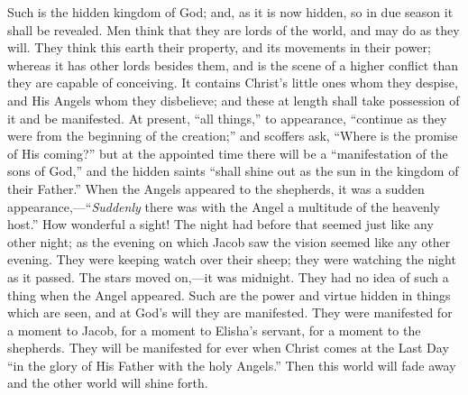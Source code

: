 Such is the hidden kingdom of God; and, as it is now hidden, so in
due season it shall be revealed. Men think that they are lords of the
world, and may do as they will. They think this earth their property,
and its movements in their power; whereas it has other lords besides
them, and is the scene of a higher conflict than they are capable of
conceiving. It contains Christ's little ones whom they despise, and
His Angels whom they disbelieve; and these at length shall take
possession of it and be manifested. At present, ``all
things,'' to appearance, ``continue as they were from the
beginning of the creation;'' and scoffers ask, ``Where is the
promise of His coming?'' but at the appointed time there will be a
``manifestation of the sons of God,'' and the hidden saints
``shall shine out as the sun in the kingdom of their Father.''
When the Angels appeared to the shepherds, it was a sudden appearance,—``\emph{Suddenly}
there was with the Angel a multitude of the heavenly host.'' How
wonderful a sight! The night had before that seemed just like any
other night; as the evening on which Jacob saw the vision seemed like
any other evening. They were keeping watch over their sheep; they were
watching the night as it passed. The stars moved on,—it was
midnight. They had no idea of such a thing when the Angel appeared.
Such are the power and virtue hidden in things which are seen, and at
God's will they are manifested. They were manifested for a moment to
Jacob, for a moment to Elisha's servant, for a moment to the
shepherds. They will be manifested for ever when Christ comes at the
Last Day ``in the glory of His Father with the holy Angels.''
Then this world will fade away and the other world will shine forth.

